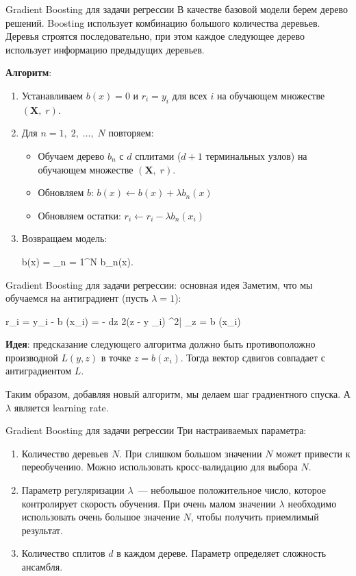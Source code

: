 \documentclass[notheorems, handout]{beamer}
\begin{document}
\begin{frame}{Gradient Boosting для задачи регрессии}
	В качестве базовой модели берем дерево решений. Boosting использует комбинацию большого количества деревьев. Деревья строятся последовательно, при этом  каждое следующее дерево использует информацию предыдущих деревьев. 
	\par\smallskip
	\textbf{Алгоритм}:
	\begin{enumerate}
		\item Устанавливаем $b(x) = 0$ и $r_{i} = y_{i}$ для всех $i$ на обучающем множестве $(\mathbf{X},\; r)$.
		\item Для $n = 1,\; 2,\; \dots,\; N$ повторяем:
			\begin{itemize}
				\item Обучаем дерево $b_{n}$ с $d$ сплитами ($d + 1$ терминальных узлов) на обучающем множестве $(\mathbf{X},\; r)$.
				\item Обновляем $b$: $b(x) \gets b(x) + \lambda b_{n}(x)$
				\item Обновляем остатки: $r_{i} \gets r_{i} - \lambda b_{n}(x_{i})$
			\end{itemize}
		\item Возвращаем модель:
			\begin{flalign*}
				b(x) = \displaystyle\sum_{n = 1}^{N} \lambda b_{n}(x).
			\end{flalign*}		
	\end{enumerate}
\end{frame}

\begin{frame}{Gradient Boosting для задачи регрессии: основная идея}
	Заметим, что мы обучаемся на антиградиент (пусть $\lambda = 1$):
	\begin{flalign*}
		r_i = y_i - b (x_i) = - {dz}  {2}(z - y _i) ^2| _{z = b (x_i)}
	\end{flalign*}
	\par\smallskip
	\textbf{Идея}: предсказание следующего алгоритма должно быть противоположно производной $L(y, z)$ в точке $z=b (x_i)$. Тогда вектор сдвигов совпадает с антиградиентом $L$.
	\par\smallskip
	Таким образом, добавляя новый алгоритм, мы делаем шаг градиентного спуска. А $\lambda$ является learning rate.
\end{frame}

\begin{frame}{Gradient Boosting для задачи регрессии}
	Три настраиваемых параметра:
	\begin{enumerate}
		\item Количество деревьев $N$. При слишком большом значении $N$ может привести к переобучению. Можно использовать кросс-валидацию для выбора $N$.
		\item Параметр регуляризации $\lambda$~--- небольшое положительное число, которое контролирует скорость обучения. При очень малом значении $\lambda$ необходимо использовать очень большое значение $N$, чтобы получить приемлимый результат.
		\item Количество сплитов $d$ в каждом дереве. Параметр определяет сложность ансамбля.
	\end{enumerate}
\end{frame}
\end{document}
